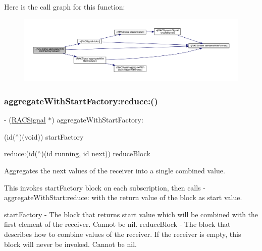Here is the call graph for this function\+:\nopagebreak
\begin{figure}[H]
\begin{center}
\leavevmode
\includegraphics[width=350pt]{interface_r_a_c_signal_a51c08c7a357f83c96c468a6aa13d4d87_cgraph}
\end{center}
\end{figure}
\mbox{\label{interface_r_a_c_signal_a51c08c7a357f83c96c468a6aa13d4d87}} 
\subsubsection{\texorpdfstring{aggregate\+With\+Start\+Factory\+:reduce\+:()}{aggregateWithStartFactory:reduce:()}\hspace{0.1cm}{\footnotesize\ttfamily [2/3]}}
{\footnotesize\ttfamily -\/ (\mbox{\hyperlink{interface_r_a_c_signal}{R\+A\+C\+Signal}} $\ast$) aggregate\+With\+Start\+Factory\+: \begin{DoxyParamCaption}\item[{(id($^\wedge$)(void))}]{start\+Factory }\item[{reduce:(id($^\wedge$)(id running, id next))}]{reduce\+Block }\end{DoxyParamCaption}}

Aggregates the {\ttfamily next} values of the receiver into a single combined value.

This invokes {\ttfamily start\+Factory} block on each subscription, then calls -\/aggregate\+With\+Start\+:reduce\+: with the return value of the block as start value.

start\+Factory -\/ The block that returns start value which will be combined with the first element of the receiver. Cannot be nil. reduce\+Block -\/ The block that describes how to combine values of the receiver. If the receiver is empty, this block will never be invoked. Cannot be nil.

